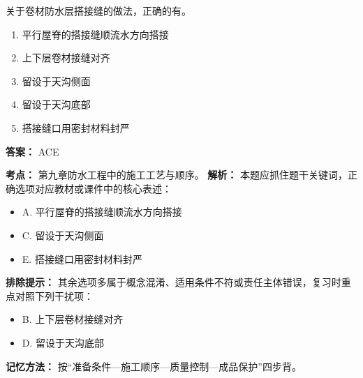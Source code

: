 \documentclass[UTF8,fontset=fandol,11pt]{ctexart}
\begin{document}
\begin{quizbox}[title={第 6 题}]
关于卷材防水层搭接缝的做法，正确的有。\\
\begin{enumerate}[label=\Alph*.]
\item 平行屋脊的搭接缝顺流水方向搭接
\item 上下层卷材接缝对齐
\item 留设于天沟侧面
\item 留设于天沟底部
\item 搭接缝口用密封材料封严
\end{enumerate}
\textbf{答案：} ACE
\vspace{0.25em}
\begin{answerbox}[title={考点解析}]
\textbf{考点：} 第九章防水工程中的施工工艺与顺序。
\textbf{解析：} 本题应抓住题干关键词，正确选项对应教材或课件中的核心表述：
\begin{itemize}
\item A. 平行屋脊的搭接缝顺流水方向搭接
\item C. 留设于天沟侧面
\item E. 搭接缝口用密封材料封严
\end{itemize}
\textbf{排除提示：} 其余选项多属于概念混淆、适用条件不符或责任主体错误，复习时重点对照下列干扰项：
\begin{itemize}
\item B. 上下层卷材接缝对齐
\item D. 留设于天沟底部
\end{itemize}
\textbf{记忆方法：} 按“准备条件—施工顺序—质量控制—成品保护”四步背。
\end{answerbox}
\end{quizbox}

\vspace{0.2em}
\end{document}
